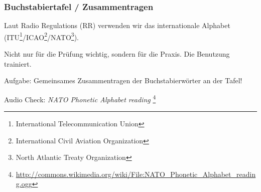 \begin{frame}
    \frametitle{Buchstabiertafel / Zusammentragen}

    Laut Radio Regulations (RR) verwenden wir das internationale Alphabet
    (ITU\footnote{\tiny International Telecommunication
    Union}/ICAO\footnote{\tiny International Civil Aviation
    Organization}/NATO\footnote{\tiny North Atlantic Treaty Organization}).

    Nicht nur für die Prüfung wichtig, sondern für die Praxis. Die Benutzung
    trainiert.

    \begin{center}
        Aufgabe: Gemeinsames Zusammentragen der Buchstabierwörter an der Tafel!
    \end{center}

    Audio Check: \emph{NATO Phonetic Alphabet reading}
    \footnote{\tiny \url{http://commons.wikimedia.org/wiki/File:NATO_Phonetic_Alphabet_reading.ogg}}

\end{frame}

